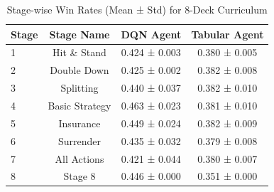 \begin{table}[h!]
\centering
\caption{Stage-wise Win Rates (Mean ± Std) for 8-Deck Curriculum}
\label{tab:stage_accuracies_8deck}
\begin{tabular}{lccc}
\hline
Stage & Stage Name & DQN Agent & Tabular Agent \\
\hline
1 & Hit \& Stand & 0.424 ± 0.003 & 0.380 ± 0.005 \\
2 & Double Down & 0.425 ± 0.002 & 0.382 ± 0.008 \\
3 & Splitting & 0.440 ± 0.037 & 0.382 ± 0.010 \\
4 & Basic Strategy & 0.463 ± 0.023 & 0.381 ± 0.010 \\
5 & Insurance & 0.449 ± 0.024 & 0.382 ± 0.009 \\
6 & Surrender & 0.435 ± 0.032 & 0.379 ± 0.008 \\
7 & All Actions & 0.421 ± 0.044 & 0.380 ± 0.007 \\
8 & Stage 8 & 0.446 ± 0.000 & 0.351 ± 0.000 \\
\hline
\end{tabular}
\end{table}
